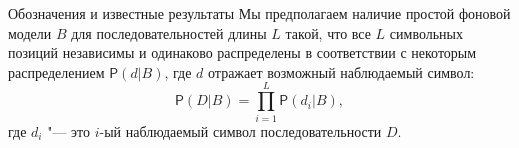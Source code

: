 \documentclass[ucs, notheorems, handout, 10pt]{beamer}
\begin{document}
	\begin{frame}{Обозначения и известные результаты}
		Мы предполагаем наличие простой фоновой модели $B$ для последовательностей длины $L$ такой, что все $L$ символьных позиций независимы и одинаково распределены в соответствии с некоторым распределением $\mathsf{P}(d|B)$, где $d$ отражает возможный наблюдаемый символ:
		\begin{equation*}
			\mathsf{P}(D|B) = \prod_{i=1}^{L}\mathsf{P}(d_{i}|B), \label{eq:4}
		\end{equation*}
		где $d_{i}$ "--- это $i$-ый наблюдаемый символ последовательности $D$.
		
	\end{frame}
\end{document}
